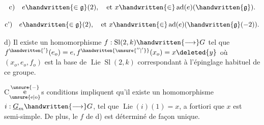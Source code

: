 \[
\text{c)}\quad e\handwritten{\in\mathfrak{g}}(2),\quad\text{et }x\handwritten{\in}\operatorname{ad}(e)(\handwritten{\mathfrak{g}}).
\]

\[
\text{c')}\quad e\handwritten{\in\mathfrak{g}}(2),\quad\text{et }x\handwritten{\in}\operatorname{ad}(e)(\handwritten{\mathfrak{g}}(-2)).
\]

d) Il existe un homomorphisme $f:\operatorname{Sl}(2,k)\handwritten{\longrightarrow}G$ tel que $f^{\handwritten{'}}(e_o)=e,f^{\handwritten{\unsure{''|'}}}(x_o)=x\deleted{y}$ où $(x_o,e_o,f_o)$ est la base de $\operatorname{Lie}\operatorname{Sl}(2,k)$ correspondant à l'épinglage habituel de ce groupe.

C$\overset{\unsure{-}}{\underset{\text{\unsure{e|o}}}{\text{e}}}$s conditions impliquent qu'il existe un homomorphisme $i:\underline{G}_m\handwritten{\longrightarrow}G$, tel que $\operatorname{Lie}(i)(1)=x$, a fortiori que $x$ est semi-simple. De plus, le $f$ de d) est déterminé de façon unique.

